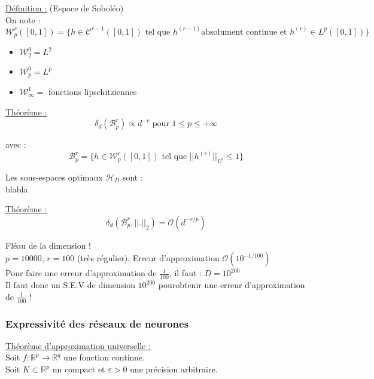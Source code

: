 \documentclass[12pt,a4paper]{article}
\begin{document}
\underline{Définition :} (Espace de Soboléo)\\
On note :
$$
\mathcal{W}_{p}^{r}([0, 1]) = \{h \in \mathcal{C}^{r-1}([0, 1]) \text{ tel que } h^{(r-1)} \text{absolument continue et } h^{(r)} \in L^p([0, 1])\}
$$

\begin{itemize}
    \item $\mathcal{W}_{2}^{0} = L^2$
    \item $\mathcal{W}_{p}^{0} = L^p$
    \item $\mathcal{W}_{\infty}^{1} =$ fonctions lipschitziennes
\end{itemize}


\underline{Théorème :}
$$
\delta_d(\mathcal{B}_{p}^{r}) \propto d^{-r} \text{ pour } 1 \leq p \leq + \infty
$$

avec :
$$
\mathcal{B}_{p}^{r} = \{h \in \mathcal{W}_{p}^{r}([0, 1]) \text{ tel que } ||h^{(r)}||_{L^p} \leq 1\}
$$


Les sous-espaces optimaux $\mathcal{H}_D$ sont : \\
blabla



\underline{Théorème :}
$$
\delta_d(\mathcal{B}_{p}^{r}, ||.||_{2}) = \mathcal{O} (d^{-{r/p}})
$$

Fléau de la dimension !\\

$p = 10 000$, $r = 100$ (très régulier).
Erreur d'approximation $\mathcal{O}(10^{-1/100})$\\
Pour faire une erreur d'approximation de $\frac{1}{100}$, il faut :
$D = 10^{200}$\\

Il faut donc un S.E.V de dimension $10^{200}$ pourobtenir une erreur d'approximation de $\frac{1}{100}$ !\\



\subsubsection{Expressivité des réseaux de neurones}

\underline{Théorème d'approximation universelle :}\\
Soit $f : \mathbb{R}^p \rightarrow \mathbb{R}^q$ une fonction continue.\\
Soit $K \subset \mathbb{R}^p$ un compact et $\varepsilon > 0$ une précision arbitraire.\\
\end{document}
